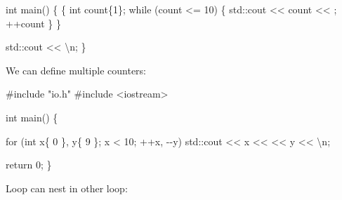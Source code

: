 \documentclass[
  letterpaper,
  DIV=11,
  numbers=noendperiod]{scrreprt}
\newenvironment{Shaded}{\begin{snugshade}}{\end{snugshade}}
\newcommand{\CommentTok}[1]{\textcolor[rgb]{0.37,0.37,0.37}{#1}}
\newcommand{\ControlFlowTok}[1]{\textcolor[rgb]{0.00,0.23,0.31}{#1}}
\newcommand{\DecValTok}[1]{\textcolor[rgb]{0.68,0.00,0.00}{#1}}
\newcommand{\ErrorTok}[1]{\textcolor[rgb]{0.68,0.00,0.00}{#1}}
\newcommand{\FunctionTok}[1]{\textcolor[rgb]{0.28,0.35,0.67}{#1}}
\newcommand{\NormalTok}[1]{\textcolor[rgb]{0.00,0.23,0.31}{#1}}
\newcommand{\SpecialCharTok}[1]{\textcolor[rgb]{0.37,0.37,0.37}{#1}}
\newcommand{\StringTok}[1]{\textcolor[rgb]{0.13,0.47,0.30}{#1}}
\begin{document}
\begin{Shaded}
\begin{Highlighting}[]
\NormalTok{int }\FunctionTok{main}\NormalTok{()}
\NormalTok{\{}
\NormalTok{    \{}
\NormalTok{        int count\{}\DecValTok{1}\NormalTok{\};}
        \ControlFlowTok{while}\NormalTok{ (count }\SpecialCharTok{\textless{}=} \DecValTok{10}\NormalTok{)}
\NormalTok{        \{}
\NormalTok{            std}\SpecialCharTok{::}\NormalTok{cout }\SpecialCharTok{\textless{}}\ErrorTok{\textless{}}\NormalTok{ count }\SpecialCharTok{\textless{}}\ErrorTok{\textless{}} \StringTok{\textquotesingle{} \textquotesingle{}}\NormalTok{;}
            \SpecialCharTok{++}\NormalTok{count}
\NormalTok{        \}}
\NormalTok{    \}}
    
\NormalTok{    std}\SpecialCharTok{::}\NormalTok{cout }\SpecialCharTok{\textless{}}\ErrorTok{\textless{}} \StringTok{\textquotesingle{}}\SpecialCharTok{\textbackslash{}n}\StringTok{\textquotesingle{}}\NormalTok{;}
\NormalTok{\}}
\end{Highlighting}
\end{Shaded}

We can define multiple counters:

\begin{Shaded}
\begin{Highlighting}[]
\CommentTok{\#include "io.h"}
\CommentTok{\#include \textless{}iostream\textgreater{}}

\NormalTok{int }\FunctionTok{main}\NormalTok{()}
\NormalTok{\{}

    \ControlFlowTok{for}\NormalTok{ (int x\{ }\DecValTok{0}\NormalTok{ \}, y\{ }\DecValTok{9}\NormalTok{ \}; x }\SpecialCharTok{\textless{}} \DecValTok{10}\NormalTok{; }\SpecialCharTok{++}\NormalTok{x, }\SpecialCharTok{{-}{-}}\NormalTok{y)}
\NormalTok{        std}\SpecialCharTok{::}\NormalTok{cout }\SpecialCharTok{\textless{}}\ErrorTok{\textless{}}\NormalTok{ x }\SpecialCharTok{\textless{}}\ErrorTok{\textless{}} \StringTok{\textquotesingle{} \textquotesingle{}} \SpecialCharTok{\textless{}}\ErrorTok{\textless{}}\NormalTok{ y }\SpecialCharTok{\textless{}}\ErrorTok{\textless{}} \StringTok{\textquotesingle{}}\SpecialCharTok{\textbackslash{}n}\StringTok{\textquotesingle{}}\NormalTok{;}
    
\NormalTok{    return }\DecValTok{0}\NormalTok{;}
\NormalTok{\}}
\end{Highlighting}
\end{Shaded}

Loop can nest in other loop:
\end{document}
